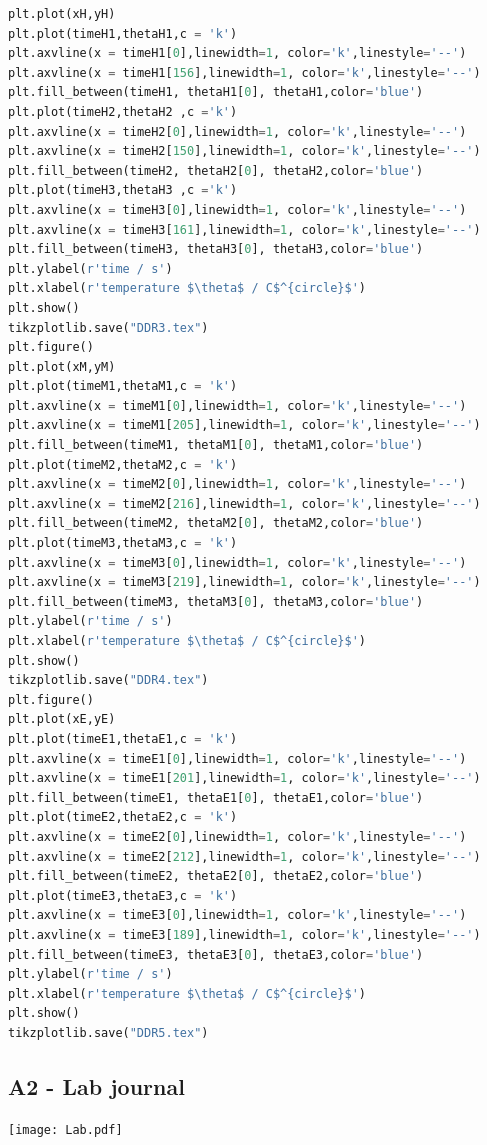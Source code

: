 \documentclass[a4paper,abstracton]{article}	                       %
\begin{document}
\begin{lstlisting}[language=Python]
plt.plot(xH,yH)
plt.plot(timeH1,thetaH1,c = 'k')
plt.axvline(x = timeH1[0],linewidth=1, color='k',linestyle='--')
plt.axvline(x = timeH1[156],linewidth=1, color='k',linestyle='--')
plt.fill_between(timeH1, thetaH1[0], thetaH1,color='blue')
plt.plot(timeH2,thetaH2 ,c ='k')
plt.axvline(x = timeH2[0],linewidth=1, color='k',linestyle='--')
plt.axvline(x = timeH2[150],linewidth=1, color='k',linestyle='--')
plt.fill_between(timeH2, thetaH2[0], thetaH2,color='blue')
plt.plot(timeH3,thetaH3 ,c ='k')
plt.axvline(x = timeH3[0],linewidth=1, color='k',linestyle='--')
plt.axvline(x = timeH3[161],linewidth=1, color='k',linestyle='--')
plt.fill_between(timeH3, thetaH3[0], thetaH3,color='blue')
plt.ylabel(r'time / s')
plt.xlabel(r'temperature $\theta$ / C$^{circle}$')
plt.show()
tikzplotlib.save("DDR3.tex")
plt.figure()
plt.plot(xM,yM)
plt.plot(timeM1,thetaM1,c = 'k')
plt.axvline(x = timeM1[0],linewidth=1, color='k',linestyle='--')
plt.axvline(x = timeM1[205],linewidth=1, color='k',linestyle='--')
plt.fill_between(timeM1, thetaM1[0], thetaM1,color='blue')
plt.plot(timeM2,thetaM2,c = 'k')
plt.axvline(x = timeM2[0],linewidth=1, color='k',linestyle='--')
plt.axvline(x = timeM2[216],linewidth=1, color='k',linestyle='--')
plt.fill_between(timeM2, thetaM2[0], thetaM2,color='blue')
plt.plot(timeM3,thetaM3,c = 'k')
plt.axvline(x = timeM3[0],linewidth=1, color='k',linestyle='--')
plt.axvline(x = timeM3[219],linewidth=1, color='k',linestyle='--')
plt.fill_between(timeM3, thetaM3[0], thetaM3,color='blue')
plt.ylabel(r'time / s')
plt.xlabel(r'temperature $\theta$ / C$^{circle}$')
plt.show()
tikzplotlib.save("DDR4.tex")
plt.figure()
plt.plot(xE,yE)
plt.plot(timeE1,thetaE1,c = 'k')
plt.axvline(x = timeE1[0],linewidth=1, color='k',linestyle='--')
plt.axvline(x = timeE1[201],linewidth=1, color='k',linestyle='--')
plt.fill_between(timeE1, thetaE1[0], thetaE1,color='blue')
plt.plot(timeE2,thetaE2,c = 'k')
plt.axvline(x = timeE2[0],linewidth=1, color='k',linestyle='--')
plt.axvline(x = timeE2[212],linewidth=1, color='k',linestyle='--')
plt.fill_between(timeE2, thetaE2[0], thetaE2,color='blue')
plt.plot(timeE3,thetaE3,c = 'k')
plt.axvline(x = timeE3[0],linewidth=1, color='k',linestyle='--')
plt.axvline(x = timeE3[189],linewidth=1, color='k',linestyle='--')
plt.fill_between(timeE3, thetaE3[0], thetaE3,color='blue')
plt.ylabel(r'time / s')
plt.xlabel(r'temperature $\theta$ / C$^{circle}$')
plt.show()
tikzplotlib.save("DDR5.tex")
\end{lstlisting}

\subsection*{A2 - Lab journal}
\texttt{[image: Lab.pdf]}
\end{document}
